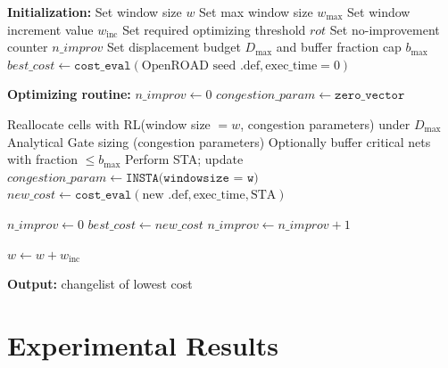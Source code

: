 \documentclass[conference]{IEEEtran}
\begin{document}
\begin{algorithm}
\caption{Incremental Window-Based Optimization Routine with RL}
\label{alg:window-opt}
\begin{algorithmic}[1]
\State \textbf{Initialization:}
\State Set window size $w$
\State Set max window size $w_{\text{max}}$
\State Set window increment value $w_{\text{inc}}$
\State Set required optimizing threshold $rot$
\State Set no-improvement counter $n\_improv$
\State Set displacement budget $D_{\max}$ and buffer fraction cap $b_{\max}$
\State $best\_cost \gets \texttt{cost\_eval}(\text{OpenROAD seed .def}, \text{exec\_time} = 0)$

\Statex
\State \textbf{Optimizing routine:}
    \State $n\_improv \gets 0$
    \State $congestion\_param \gets \texttt{zero\_vector}$
    
        \State Reallocate cells with RL(window size $= w$, congestion parameters) under $D_{\max}$
        \State Analytical Gate sizing (congestion parameters)
        \State Optionally buffer critical nets with fraction $\le b_{\max}$
        \State Perform STA; update $congestion\_param \gets \texttt{INSTA(windowsize = w)}$
        \State $new\_cost \gets \texttt{cost\_eval}(\text{new .def}, \text{exec\_time}, \text{STA})$

            \State $n\_improv \gets 0$
            \State $best\_cost \gets new\_cost$
        \Else
            \State $n\_improv \gets n\_improv + 1$
        \EndIf
    \EndWhile

    \State $w \gets w + w_{\text{inc}}$
\EndWhile

\State \textbf{Output:} changelist of lowest cost
\end{algorithmic}
\end{algorithm}

\section{Experimental Results}
\end{document}
